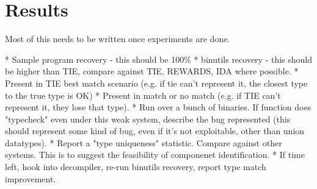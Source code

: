 \section{Results}
\label{sec:results}
Most of this needs to be written once experiments are done.

* Sample program recovery - this should be 100\%
* binutils recovery - this should be higher than TIE, compare against TIE, REWARDS, IDA where possible.
	* Present in TIE best match scenario (e.g. if tie can't represent it, the closest type to the true type is OK)
	* Present in match or no match (e.g. if TIE can't represent it, they lose that type).
* Run over a bunch of binaries. If function does "typecheck" even under this weak system, describe the bug represented (this should represent some kind of bug, even if it's not exploitable, other than union datatypes).
* Report a "type uniqueness" statistic. Compare against other systems. This is to suggest the feasibility of componenet identification.
* If time left, hook into decompiler, re-run binutils recovery, report type match improvement.
